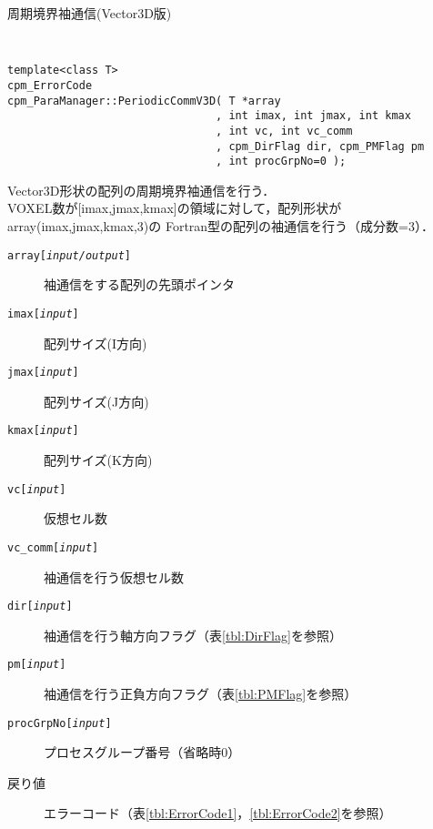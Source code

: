 \begin{spacing}{0.8}
\begin{itembox}[l]{周期境界袖通信(Vector3D版)}
{\tt
\begin{verbatim}
template<class T>
cpm_ErrorCode
cpm_ParaManager::PeriodicCommV3D( T *array
                                , int imax, int jmax, int kmax
                                , int vc, int vc_comm
                                , cpm_DirFlag dir, cpm_PMFlag pm
                                , int procGrpNo=0 );
\end{verbatim}
}
Vector3D形状の配列の周期境界袖通信を行う．\\
VOXEL数が[imax,jmax,kmax]の領域に対して，配列形状がarray(imax,jmax,kmax,3)の
Fortran型の配列の袖通信を行う（成分数=3）．
\begin{description}
\item[{\tt array[{\it input/output}]}] 袖通信をする配列の先頭ポインタ
\item[{\tt imax[{\it input}]}] 配列サイズ(I方向)
\item[{\tt jmax[{\it input}]}] 配列サイズ(J方向)
\item[{\tt kmax[{\it input}]}] 配列サイズ(K方向)
\item[{\tt vc[{\it input}]}] 仮想セル数
\item[{\tt vc\_comm[{\it input}]}] 袖通信を行う仮想セル数
\item[{\tt dir[{\it input}]}] 袖通信を行う軸方向フラグ（表\ref{tbl:DirFlag}を参照）
\item[{\tt pm[{\it input}]}] 袖通信を行う正負方向フラグ（表\ref{tbl:PMFlag}を参照）
\item[{\tt procGrpNo[{\it input}]}] プロセスグループ番号（省略時0）
\\
\item[戻り値] エラーコード（表\ref{tbl:ErrorCode1}，\ref{tbl:ErrorCode2}を参照）
\end{description}
\end{itembox}\\
\end{spacing}

